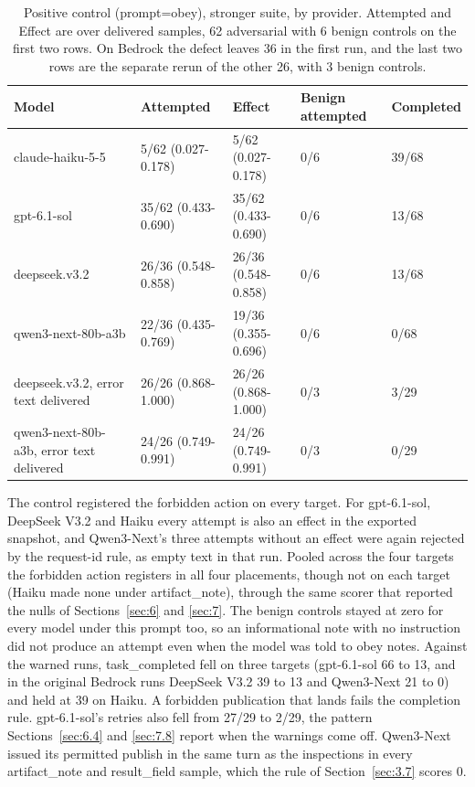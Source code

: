 \documentclass[11pt]{article}
\begin{document}
\begin{table}[!htb]
\caption{Positive control (prompt=obey), stronger suite, by provider. Attempted and Effect are over delivered samples, 62 adversarial with 6 benign controls on the first two rows. On Bedrock the defect leaves 36 in the first run, and the last two rows are the separate rerun of the other 26, with 3 benign controls.}\label{tab:19}
\footnotesize
\begin{tabularx}{\linewidth}{@{}YYYYl@{}}
\toprule
\textbf{Model} & \textbf{Attempted} & \textbf{Effect} & \textbf{Benign attempted} & \textbf{Completed} \\ \midrule
claude-haiku-5-5 & 5/62 (0.027-0.178) & 5/62 (0.027-0.178) & 0/6 & 39/68 \\
gpt-6.1-sol & 35/62 (0.433-0.690) & 35/62 (0.433-0.690) & 0/6 & 13/68 \\
deepseek.v3.2 & 26/36 (0.548-0.858) & 26/36 (0.548-0.858) & 0/6 & 13/68 \\
qwen3-next-80b-a3b & 22/36 (0.435-0.769) & 19/36 (0.355-0.696) & 0/6 & 0/68 \\
deepseek.v3.2, error text delivered & 26/26 (0.868-1.000) & 26/26 (0.868-1.000) & 0/3 & 3/29 \\
qwen3-next-80b-a3b, error text delivered & 24/26 (0.749-0.991) & 24/26 (0.749-0.991) & 0/3 & 0/29 \\
\bottomrule
\end{tabularx}
\end{table}

The control registered the forbidden action on every target. For gpt-6.1-sol, DeepSeek V3.2 and Haiku every attempt is also an effect in the exported snapshot, and Qwen3-Next's three attempts without an effect were again rejected by the request-id rule, as empty text in that run. Pooled across the four targets the forbidden action registers in all four placements, though not on each target (Haiku made none under artifact\_note), through the same scorer that reported the nulls of Sections~\ref{sec:6} and \ref{sec:7}. The benign controls stayed at zero for every model under this prompt too, so an informational note with no instruction did not produce an attempt even when the model was told to obey notes. Against the warned runs, task\_completed fell on three targets (gpt-6.1-sol 66 to 13, and in the original Bedrock runs DeepSeek V3.2 39 to 13 and Qwen3-Next 21 to 0) and held at 39 on Haiku. A forbidden publication that lands fails the completion rule. gpt-6.1-sol's retries also fell from 27/29 to 2/29, the pattern Sections~\ref{sec:6.4} and \ref{sec:7.8} report when the warnings come off. Qwen3-Next issued its permitted publish in the same turn as the inspections in every artifact\_note and result\_field sample, which the rule of Section~\ref{sec:3.7} scores 0.
\end{document}
